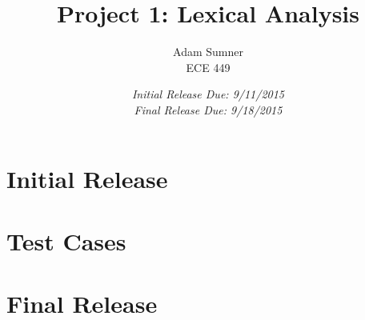 \documentclass[]{article}
\title{\textbf{Project 1: Lexical Analysis}}
\author{Adam Sumner\\ECE 449}
\date{\textit{Initial Release Due: 9/11/2015}\\ \textit{Final Release Due: 9/18/2015}}
\begin{document}
\maketitle

\section{Initial Release}

\section{Test Cases}

\section{Final Release}
\end{document}
